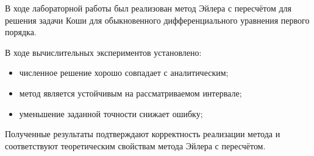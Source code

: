 \documentclass[14pt]{extarticle}
\begin{document}
	В ходе лабораторной работы был реализован
	метод Эйлера с пересчётом
	для решения задачи Коши
	для обыкновенного дифференциального уравнения
	первого порядка.

	В ходе вычислительных экспериментов установлено:
	
	\begin{itemize}
		\item численное решение хорошо совпадает
		с аналитическим;
		\item метод является устойчивым
		на рассматриваемом интервале;
		\item уменьшение заданной точности
		снижает ошибку;
	\end{itemize}
	
	Полученные результаты подтверждают
	корректность реализации метода
	и соответствуют теоретическим свойствам
	метода Эйлера с пересчётом.
	
	
	
\end{document}
